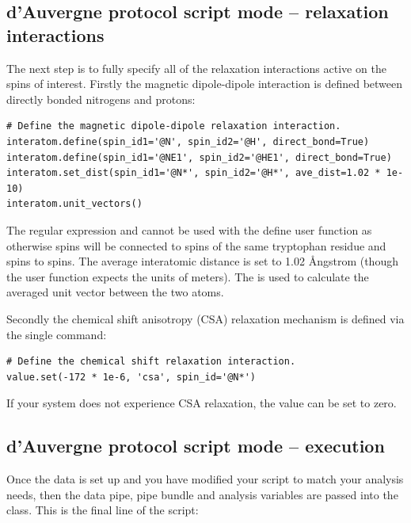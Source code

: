 
\subsection{d'Auvergne protocol script mode -- relaxation interactions}

The next step is to fully specify all of the relaxation interactions active on the spins of interest.
Firstly the magnetic dipole-dipole interaction is defined between directly bonded nitrogens and protons:

\begin{lstlisting}[firstnumber=192]
# Define the magnetic dipole-dipole relaxation interaction.
interatom.define(spin_id1='@N', spin_id2='@H', direct_bond=True)
interatom.define(spin_id1='@NE1', spin_id2='@HE1', direct_bond=True)
interatom.set_dist(spin_id1='@N*', spin_id2='@H*', ave_dist=1.02 * 1e-10)
interatom.unit_vectors()
\end{lstlisting}

The regular expression  and  cannot be used with the  define user function as otherwise  spins will be connected to  spins of the same tryptophan residue and  spins to  spins.
The average interatomic distance is set to 1.02 \AA ngstrom (though the  user function expects the units of meters).
The  is used to calculate the averaged unit vector between the two atoms.

Secondly the chemical shift anisotropy (CSA) relaxation mechanism is defined via the single command:

\begin{lstlisting}[firstnumber=198]
# Define the chemical shift relaxation interaction.
value.set(-172 * 1e-6, 'csa', spin_id='@N*')
\end{lstlisting}

If your system does not experience CSA relaxation, the value can be set to zero.


\subsection{d'Auvergne protocol script mode -- execution}

Once the data is set up and you have modified your script to match your analysis needs, then the data pipe, pipe bundle and analysis variables are passed into the  class.
This is the final line of the script:

